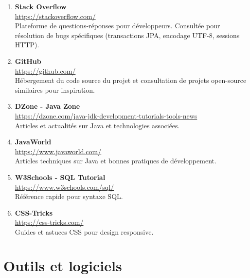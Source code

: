 \documentclass[12pt,a4paper]{report}
\begin{document}
\begin{enumerate}
    \item \textbf{Stack Overflow} \\
    \url{https://stackoverflow.com/} \\
    Plateforme de questions-réponses pour développeurs. Consultée pour résolution de bugs spécifiques (transactions JPA, encodage UTF-8, sessions HTTP).
    
    \item \textbf{GitHub} \\
    \url{https://github.com/} \\
    Hébergement du code source du projet et consultation de projets open-source similaires pour inspiration.
    
    \item \textbf{DZone - Java Zone} \\
    \url{https://dzone.com/java-jdk-development-tutorials-tools-news} \\
    Articles et actualités sur Java et technologies associées.
    
    \item \textbf{JavaWorld} \\
    \url{https://www.javaworld.com/} \\
    Articles techniques sur Java et bonnes pratiques de développement.
    
    \item \textbf{W3Schools - SQL Tutorial} \\
    \url{https://www.w3schools.com/sql/} \\
    Référence rapide pour syntaxe SQL.
    
    \item \textbf{CSS-Tricks} \\
    \url{https://css-tricks.com/} \\
    Guides et astuces CSS pour design responsive.
\end{enumerate}

\section*{Outils et logiciels}
\end{document}
